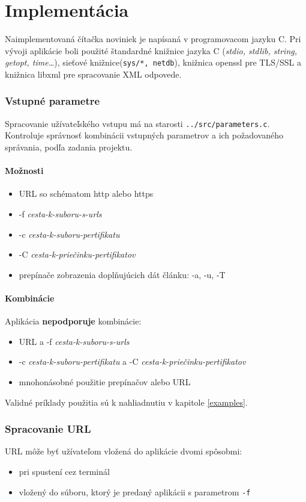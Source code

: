 \chapter{Implementácia}
Naimplementovaná čítačka noviniek je napísaná v programovacom jazyku C. Pri vývoji aplikácie boli použité štandardné knižnice jazyka C ({\it stdio, stdlib, string, getopt, time\dots}), sieťové knižnice({\tt sys/*, netdb}), knižnica openssl pre TLS/SSL a knižnica libxml pre spracovanie XML odpovede.
\subsection*{Vstupné parametre}
Spracovanie užívateľského vstupu má na starosti {\tt ../src/parameters.c}. Kontroluje správnosť kombinácii vstupných parametrov a ich požadovaného správania, podľa zadania projektu.
\subsubsection{Možnosti}
\begin{itemize}
  \item{URL so schématom http alebo https}
  \item{-f {\it cesta-k-suboru-s-urls}}
  \item{-c {\it cesta-k-suboru-pertifikatu}}
  \item{-C {\it cesta-k-priečinku-pertifikatov}}
  \item{prepínače zobrazenia doplňujúcich dát článku: -a, -u, -T}
\end{itemize}
\subsubsection{Kombinácie}
Aplikácia \textbf{nepodporuje} kombinácie:
\begin{itemize}
  \item{URL a -f {\it cesta-k-suboru-s-urls}}
  \item{-c {\it cesta-k-suboru-pertifikatu} a -C {\it cesta-k-priečinku-pertifikatov}}
  \item{mnohonásobné použitie prepínačov alebo URL}
\end{itemize}

Validné príklady použitia sú k nahliadnutiu v kapitole \ref{examples}.

\subsection*{Spracovanie URL}
URL môže byť užívateľom vložená do aplikácie dvomi spôsobmi:
\begin{itemize}
  \item{pri spustení cez terminál}
  \item{vložený do súboru, ktorý je predaný aplikácii s parametrom {\tt -f}}
\end{itemize}

